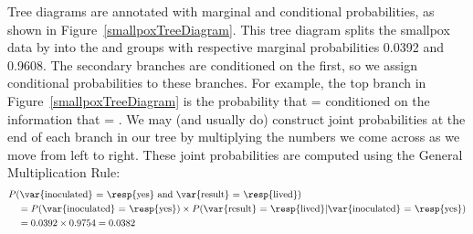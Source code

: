 Tree diagrams are annotated with marginal and conditional probabilities, as shown in Figure~\ref{smallpoxTreeDiagram}. This tree diagram splits the smallpox data by  into the  and  groups with respective marginal probabilities 0.0392 and 0.9608. The secondary branches are conditioned on the first, so we assign conditional probabilities to these branches. For example, the top branch in Figure~\ref{smallpoxTreeDiagram} is the probability that  =  conditioned on the information that  = . We may (and usually do) construct joint probabilities at the end of each branch in our tree by multiplying the numbers we come across as we move from left to right. These joint probabilities are computed using the General Multiplication Rule:
\begin{align*}
& P(\text{\var{inoculated} = \resp{yes}
    and \var{result} = \resp{lived}}) \\
  &\quad = P(\text{\var{inoculated} = \resp{yes}})\times
      P(\text{\var{result} = \resp{lived}}|
          \text{\var{inoculated} = \resp{yes}}) \\
  &\quad = 0.0392\times 0.9754=0.0382
\end{align*}

